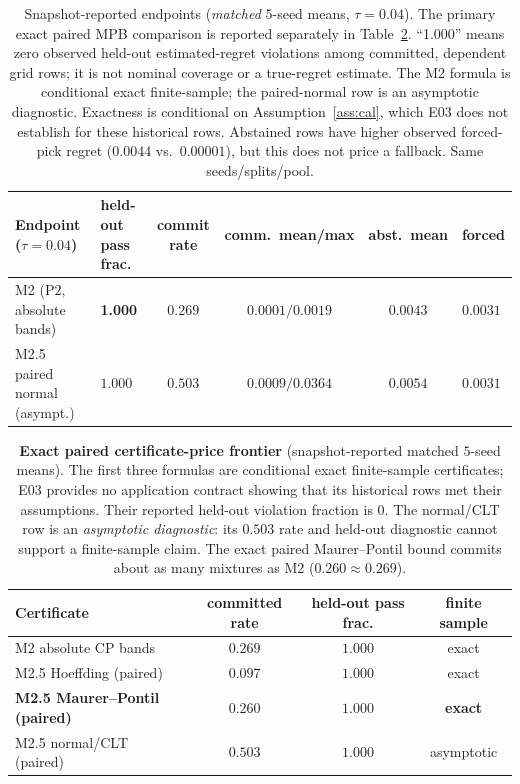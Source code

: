\documentclass{article}
\begin{document}
\FloatBarrier
\begin{table}[H]
\centering\small\setlength{\tabcolsep}{3pt}
\begin{tabular}{llcccl}
\toprule
Endpoint ($\tau{=}0.04$) & held-out pass frac. & commit rate &
 comm.\ mean/max & abst.\ mean & forced \\
\midrule
M2 ($\mathrm{P2}$, absolute bands) &
 \textbf{1.000} & $0.269$ &
 $0.0001/0.0019$ & $0.0043$ & $0.0031$ \\
M2.5 paired normal (asympt.) &
 $1.000$ & $0.503$ &
 $0.0009/0.0364$ & $0.0054$ & $0.0031$ \\
\bottomrule
\end{tabular}
\caption{Snapshot-reported endpoints (\emph{matched} $5$-seed means, $\tau{=}0.04$).
The primary exact paired MPB comparison is reported separately in
Table~\ref{tab:frontier}. ``1.000'' means
zero observed held-out estimated-regret violations among committed, dependent grid rows; it is
not nominal coverage or a true-regret estimate. The M2 formula is conditional exact finite-sample; the
paired-normal row is an asymptotic diagnostic. Exactness is conditional on
Assumption~\ref{ass:cal}, which E03 does not establish for these historical rows. Abstained rows have higher observed forced-pick regret
($0.0044$ vs.\ $0.00001$), but this does not price a fallback. Same seeds/splits/pool.}
\label{tab:main}
\end{table}

\begin{table}[H]
\centering\small
\begin{tabular}{lccc}
\toprule
Certificate & committed rate & held-out pass frac. & finite sample \\
\midrule
M2 absolute CP bands & $0.269$ & $1.000$ & exact \\
M2.5 Hoeffding (paired) & $0.097$ & $1.000$ & exact \\
\bfseries M2.5 Maurer--Pontil (paired) &
 \bfseries $0.260$ & \bfseries $1.000$ & \bfseries exact \\
M2.5 normal/CLT (paired) &
 $0.503$ & $1.000$ & asymptotic \\
\bottomrule
\end{tabular}
\caption{\textbf{Exact paired certificate-price frontier} (snapshot-reported matched $5$-seed means). The first three formulas
are conditional exact finite-sample certificates; E03 provides no application contract showing
that its historical rows met their assumptions. Their reported held-out violation fraction is $0$. The
normal/CLT row is an \emph{asymptotic diagnostic}: its $0.503$ rate and held-out diagnostic
cannot support a finite-sample claim. The exact paired Maurer--Pontil bound commits about as
many mixtures as M2 ($0.260\approx0.269$).}
\label{tab:frontier}
\end{table}
\end{document}
